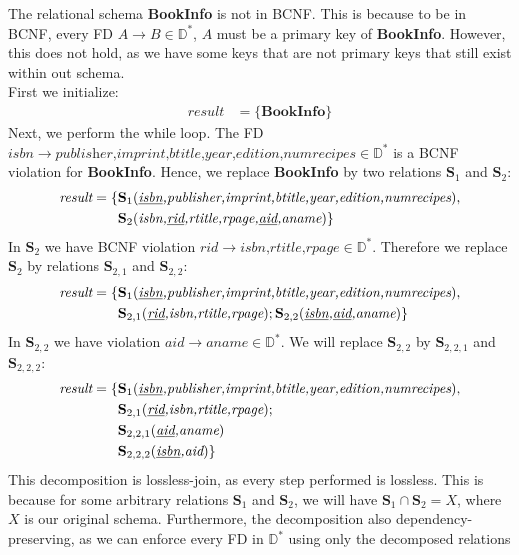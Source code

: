 \documentclass[letterpaper]{article}
\theoremstyle{plain}
\theoremstyle{definition}
\theoremstyle{remark}
\begin{document}
\subsubsection{}
The relational schema \textbf{BookInfo} is not in BCNF. This is because to be in BCNF, every FD $A\to B\in\mathbb{D}^*$, $A$ must be a primary key of \textbf{BookInfo}. However, this does not hold, as we have some keys that are not primary keys that still exist within out schema.\\[1em]
First we initialize:
\begin{align*}
    \textit{result}&=\{\textbf{BookInfo}\}
\end{align*}
Next, we perform the while loop. The FD $\textit{isbn}\to\textit{publisher,imprint,btitle,year,edition,numrecipes}\in\mathbb{D}^*$ is a BCNF violation for \textbf{BookInfo}. Hence, we replace \textbf{BookInfo} by two relations $\textbf{S}_1$ and $\textbf{S}_2$:
\begin{align*}
    \textit{result}=\{&\textbf{S}_1(\textit{\underline{isbn},publisher,imprint,btitle,year,edition,numrecipes}),\\
    &\textbf{S}_2(\textit{isbn,\underline{rid},rtitle,rpage,\underline{aid},aname})\}
\end{align*}
In $\textbf{S}_2$ we have BCNF violation $\textit{rid}\to\textit{isbn,rtitle,rpage}\in\mathbb{D}^*$. Therefore we replace $\textbf{S}_2$ by relations $\textbf{S}_{2,1}$ and $\textbf{S}_{2,2}$:
\begin{align*}
    \textit{result}=\{&\textbf{S}_1(\textit{\underline{isbn},publisher,imprint,btitle,year,edition,numrecipes}),\\
    &\textbf{S}_{2,1}(\textit{\underline{rid},isbn,rtitle,rpage});\textbf{S}_{2,2}(\textit{\underline{isbn},\underline{aid},aname})\}
\end{align*}
In $\textbf{S}_{2,2}$ we have violation $\textit{aid}\to\textit{aname}\in\mathbb{D}^*$. We will replace $\textbf{S}_{2,2}$ by $\textbf{S}_{2,2,1}$ and $\textbf{S}_{2,2,2}$:
\begin{align*}
    \textit{result}=\{&\textbf{S}_1(\textit{\underline{isbn},publisher,imprint,btitle,year,edition,numrecipes}),\\
    &\textbf{S}_{2,1}(\textit{\underline{rid},isbn,rtitle,rpage});\\
    &\textbf{S}_{2,2,1}(\textit{\underline{aid},aname})\\
    &\textbf{S}_{2,2,2}(\textit{\underline{isbn},aid})\}
\end{align*}
This decomposition is lossless-join, as every step performed is lossless. This is because for some arbitrary relations $\textbf{S}_1$ and $\textbf{S}_2$, we will have $\textbf{S}_1\cap\textbf{S}_2=X$, where $X$ is our original schema. Furthermore, the decomposition also dependency-preserving, as we can enforce every FD in $\mathbb{D}^*$ using only the decomposed relations
\end{document}

